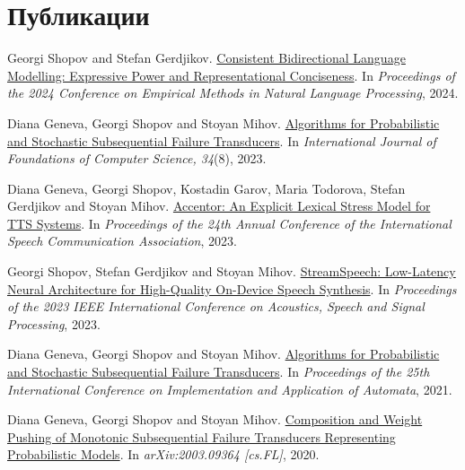 \documentclass[12pt,a4paper,sans,colorlinks]{moderncv}
\begin{document}
\section{Публикации}
\begin{cvenumerate}
	\item Georgi Shopov and Stefan Gerdjikov. \newline \href{https://aclanthology.org/2024.emnlp-main.328/}{Consistent Bidirectional Language Modelling: Expressive Power and Representational Conciseness}. \newline In \emph{Proceedings of the 2024 Conference on Empirical Methods in Natural Language Processing}, 2024.
	\item Diana Geneva, Georgi Shopov and Stoyan Mihov. \newline \href{https://www.worldscientific.com/doi/10.1142/S012905412243002X}{Algorithms for Probabilistic and Stochastic Subsequential Failure Transducers}. \newline In \emph{International Journal of Foundations of Computer Science, 34}(8), 2023.
	\item Diana Geneva, Georgi Shopov, Kostadin Garov, Maria Todorova, Stefan Gerdjikov and Stoyan Mihov. \newline \href{https://www.isca-archive.org/interspeech_2023/geneva23_interspeech.html}{Accentor: An Explicit Lexical Stress Model for TTS Systems}. \newline In \emph{Proceedings of the 24th Annual Conference of the International Speech Communication Association}, 2023.
	\item Georgi Shopov, Stefan Gerdjikov and Stoyan Mihov. \newline \href{https://ieeexplore.ieee.org/document/10096566}{StreamSpeech: Low-Latency Neural Architecture for High-Quality On-Device Speech Synthesis}. \newline In \emph{Proceedings of the 2023 IEEE International Conference on Acoustics, Speech and Signal Processing}, 2023.
	\item Diana Geneva, Georgi Shopov and Stoyan Mihov. \newline \href{https://link.springer.com/chapter/10.1007/978-3-030-79121-6_11}{Algorithms for Probabilistic and Stochastic Subsequential Failure Transducers}. \newline In \emph{Proceedings of the 25th International Conference on Implementation and Application of Automata}, 2021.
	\item Diana Geneva, Georgi Shopov and Stoyan Mihov. \newline \href{https://arxiv.org/abs/2003.09364}{Composition and Weight Pushing of Monotonic Subsequential Failure Transducers Representing Probabilistic Models}. \newline In \emph{arXiv:2003.09364 [cs.FL]}, 2020.

\end{cvenumerate}
\end{document}
